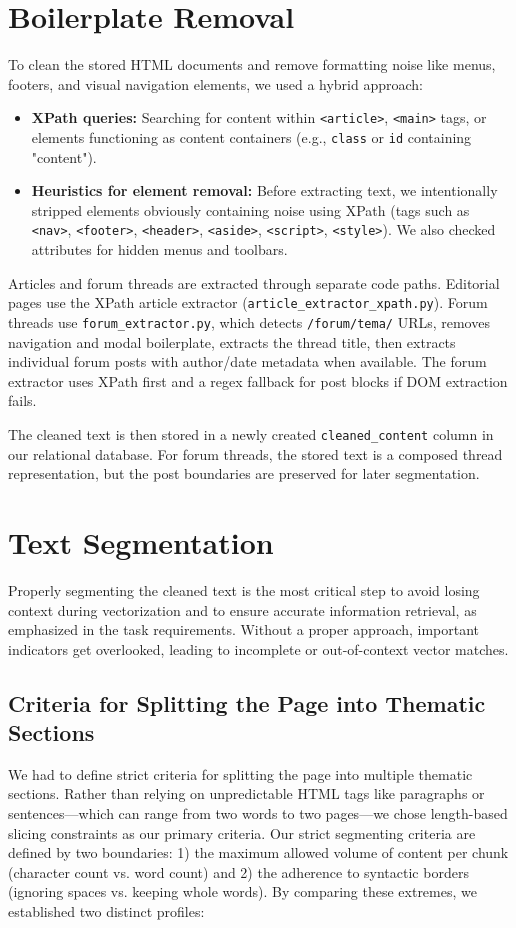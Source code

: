 \documentclass[9pt]{IEEEtran}
\begin{document}
\section{Boilerplate Removal}
To clean the stored HTML documents and remove formatting noise like menus, footers, and visual navigation elements, we used a hybrid approach:
\begin{itemize}
    \item \textbf{XPath queries:} Searching for content within \texttt{<article>}, \texttt{<main>} tags, or elements functioning
    as content containers (e.g., \texttt{class} or \texttt{id} containing "content").
    \item \textbf{Heuristics for element removal:} Before extracting text, we intentionally stripped elements obviously containing
    noise using XPath (tags such as \texttt{<nav>}, \texttt{<footer>}, \texttt{<header>}, \texttt{<aside>}, \texttt{<script>}, \texttt{<style>}). We also checked attributes for hidden menus and toolbars.
\end{itemize}

Articles and forum threads are extracted through separate code paths. Editorial pages use the XPath article extractor (\texttt{article\_extractor\_xpath.py}).
Forum threads use \texttt{forum\_extractor.py}, which detects \texttt{/forum/tema/} URLs, removes navigation and modal boilerplate, extracts the thread title, then extracts individual forum posts with author/date metadata when available.
The forum extractor uses XPath first and a regex fallback for post blocks if DOM extraction fails.

The cleaned text is then stored in a newly created \texttt{cleaned\_content} column in our relational database. For forum threads, the stored text is a composed thread representation, but the post boundaries are preserved for later segmentation.

\section{Text Segmentation}
Properly segmenting the cleaned text is the most critical step to avoid losing context during vectorization and to ensure accurate information retrieval,
as emphasized in the task requirements. Without a proper approach, important indicators get overlooked, leading to incomplete or out-of-context vector matches.

\subsection{Criteria for Splitting the Page into Thematic Sections}
We had to define strict criteria for splitting the page into multiple thematic sections. Rather than relying on unpredictable HTML tags like paragraphs or sentences—which can range from two words to two pages—we chose
length-based slicing constraints as our primary criteria. Our strict segmenting criteria are defined by two boundaries: 1) the maximum allowed volume of content per chunk (character count vs. word count)
and 2) the adherence to syntactic borders (ignoring spaces vs. keeping whole words). By comparing these extremes, we established two distinct profiles:
\end{document}
